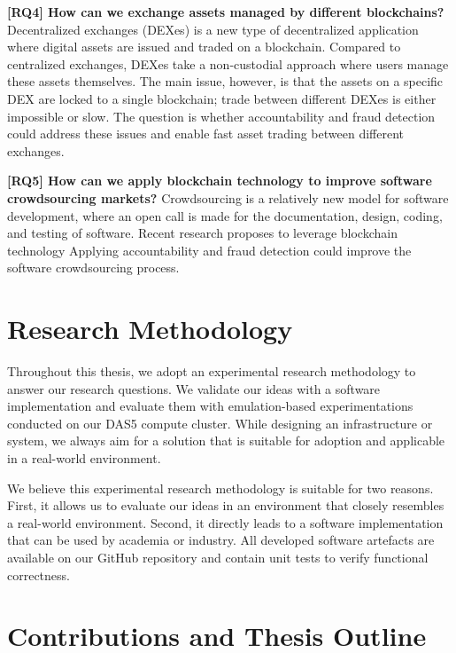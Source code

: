 \textbf{[RQ4] How can we exchange assets managed by different blockchains?}
Decentralized exchanges (DEXes) is a new type of decentralized application where digital assets are issued and traded on a blockchain.
Compared to centralized exchanges, DEXes take a non-custodial approach where users manage these assets themselves.
The main issue, however, is that the assets on a specific DEX are locked to a single blockchain; trade between different DEXes is either impossible or slow.
The question is whether accountability and fraud detection could address these issues and enable fast asset trading between different exchanges.

\textbf{[RQ5] How can we apply blockchain technology to improve software crowdsourcing markets?}
Crowdsourcing is a relatively new model for software development, where an open call is made for the documentation, design, coding, and testing of software.
Recent research proposes to leverage blockchain technology
Applying accountability and fraud detection could improve the software crowdsourcing process.

\section{Research Methodology}


Throughout this thesis, we adopt an experimental research methodology to answer our research questions.
We validate our ideas with a software implementation and evaluate them with emulation-based experimentations conducted on our DAS5 compute cluster.
While designing an infrastructure or system, we always aim for a solution that is suitable for adoption and applicable in a real-world environment.


We believe this experimental research methodology is suitable for two reasons.
First, it allows us to evaluate our ideas in an environment that closely resembles a real-world environment.
Second, it directly leads to a software implementation that can be used by academia or industry.
All developed software artefacts are available on our GitHub repository and contain unit tests to verify functional correctness.



\section{Contributions and Thesis Outline}

